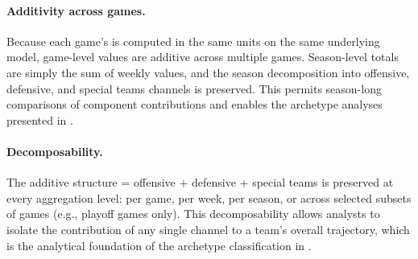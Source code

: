 \paragraph{Additivity across games.}
Because each game's \gds{} is computed in the same units on the same
underlying \xscore{} model, game-level \gds{} values are additive across
multiple games. Season-level \gds{} totals are simply the sum of weekly
values, and the season decomposition into offensive, defensive, and special
teams channels is preserved. This permits season-long comparisons of component
contributions and enables the archetype analyses presented in
.

\paragraph{Decomposability.}
The additive structure \gds{} = offensive + defensive + special teams is
preserved at every aggregation level: per game, per week, per season, or
across selected subsets of games (e.g., playoff games only). This
decomposability allows analysts to isolate the contribution of any single
channel to a team's overall \gds{} trajectory, which is the analytical
foundation of the archetype classification in .
